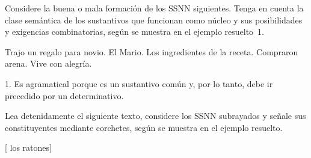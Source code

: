 \begin{ejercicio}\label{ej:05-buenaformacion}
Considere la buena o mala formación de los SSNN siguientes. Tenga en cuenta la
clase semántica de los sustantivos que funcionan como núcleo y sus posibilidades
y exigencias combinatorias, según se muestra en el ejemplo resuelto~1.

\begin{exe}
  \ex Trajo un regalo para novio.
  \ex El Mario.
  \ex Los ingredientes de la receta.
  \ex Compraron arena.
  \ex Vive con alegría.
\end{exe}

\begin{resuelto}
1. Es agramatical porque  es un sustantivo común y, por lo tanto,
debe ir precedido por un determinativo.
\end{resuelto}
\end{ejercicio}

\begin{ejercicio}\label{ej:05-ratones}
Lea detenidamente el siguiente texto, considere los SSNN subrayados y señale sus
constituyentes mediante corchetes, según se muestra en el ejemplo resuelto.


\begin{resuelto}
{}[ los ratones]
\end{resuelto}
\end{ejercicio}

